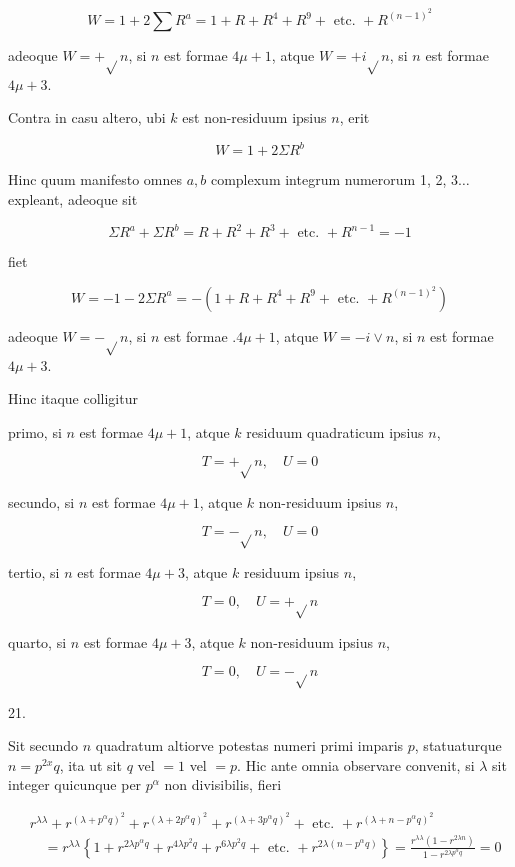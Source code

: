 \documentclass[10pt]{article}
\begin{document}
\[
W=1+2 \sum R^{a}=1+R+R^{4}+R^{9}+\text { etc. }+R^{(n-1)^{2}}
\]

adeoque \(W=+\sqrt{ } n\), si \(n\) est formae \(4 \mu+1\), atque \(W=+i \sqrt{ } n\), si \(n\) est formae \(4 \mu+3\).

Contra in casu altero, ubi \(k\) est non-residuum ipsius \(n\), erit

\[
W=1+2 \Sigma R^{b}
\]

Hinc quum manifesto omnes \(a, b\) complexum integrum numerorum 1, 2, \(3 \ldots\) expleant, adeoque sit

\[
\Sigma R^{a}+\Sigma R^{b}=R+R^{2}+R^{3}+\text { etc. }+R^{n-1}=-1
\]

fiet

\[
W=-1-2 \Sigma R^{a}=-\left(1+R+R^{4}+R^{9}+\text { etc. }+R^{(n-1)^{2}}\right)
\]

adeoque \(W=-\sqrt{ } n\), si \(n\) est formae \(.4 \mu+1\), atque \(W=-i \vee n\), si \(n\) est formae \(4 \mu+3\).

Hinc itaque colligitur

primo, si \(n\) est formae \(4 \mu+1\), atque \(k\) residuum quadraticum ipsius \(n\),

\[
T=+\sqrt{ } n, \quad U=0
\]

secundo, si \(n\) est formae \(4 \mu+1\), atque \(k\) non-residuum ipsius \(n\),

\[
T=-\sqrt{ } n, \quad U=0
\]

tertio, si \(n\) est formae \(4 \mu+3\), atque \(k\) residuum ipsius \(n\),

\[
T=0, \quad U=+\sqrt{ } n
\]

quarto, si \(n\) est formae \(4 \mu+3\), atque \(k\) non-residuum ipsius \(n\),

\[
T=0, \quad U=-\sqrt{ } n
\]

21.

Sit secundo \(n\) quadratum altiorve potestas numeri primi imparis \(p\), statuaturque \(n=p^{2 x} q\), ita ut sit \(q\) vel \(=1\) vel \(=p\). Hic ante omnia observare convenit, si \(\lambda\) sit integer quicunque per \(p^{\alpha}\) non divisibilis, fieri

\[
\begin{aligned}
& r^{\lambda \lambda}+r^{\left(\lambda+p^{\alpha} q\right)^{2}}+r^{\left(\lambda+2 p^{\alpha} q\right)^{2}}+r^{\left(\lambda+3 p^{\alpha} q\right)^{2}}+\text { etc. }+r^{\left(\lambda+n-p^{\alpha} q\right)^{2}} \\
& \quad=r^{\lambda \lambda}\left\{1+r^{2 \lambda p^{\alpha} q}+r^{4 \lambda p^{2} q}+r^{6 \lambda p^{2} q}+\text { etc. }+r^{2 \lambda\left(n-p^{\alpha} q\right)}\right\}=\frac{r^{\lambda \lambda}\left(1-r^{2 \lambda n}\right)}{1-r^{2 \lambda p^{\alpha} q}}=0
\end{aligned}
\]
\end{document}
